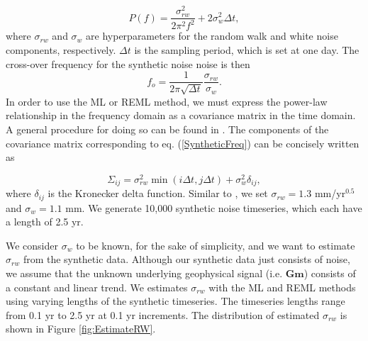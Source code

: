 \documentclass[10pt,a4paper]{article}
\begin{document}
\begin{equation}\label{SyntheticFreq}
P(f) = \frac{\sigma_{rw}^2}{2\pi^2 f^2} + 2\sigma_w^2\Delta t,
\end{equation}  
where $\sigma_{rw}$ and $\sigma_w$ are hyperparameters for the random walk and white noise components, respectively. $\Delta t$ is the sampling period, which is set at one day. The cross-over frequency for the synthetic noise noise is then
\begin{equation}\label{Crossover}
f_o = \frac{1}{2\pi\sqrt{\Delta t}}\frac{\sigma_{rw}}{\sigma_w}.  
\end{equation}
In order to use the ML or REML method, we must express the power-law relationship in the frequency domain as a covariance matrix in the time domain. A general procedure for doing  so can be found in \citet{Langbein2004}. The components of the covariance matrix corresponding to eq. (\ref{SyntheticFreq}) can be concisely written as

\begin{equation}\label{Covariance}
\Sigma_{ij} = \sigma_{rw}^2 \min(i\Delta t,j\Delta t) + \sigma_w^2 \delta_{ij},
\end{equation} 
where $\delta_{ij}$ is the Kronecker delta function. Similar to \citet{Langbein2012}, we set $\sigma_{rw} = 1.3$ mm/yr$^{0.5}$ and $\sigma_w = 1.1$ mm. We generate 10,000 synthetic noise timeseries, which each have a length of 2.5 yr. 

We consider $\sigma_w$ to be known, for the sake of simplicity, and we want to estimate $\sigma_{rw}$ from the synthetic data. Although our synthetic data just consists of noise, we assume that the unknown underlying geophysical signal (i.e. $\mathbf{G}\mathbf{m}$) consists of a constant and linear trend. We estimates $\sigma_{rw}$ with the ML and REML methods using varying lengths of the synthetic timeseries. The timeseries lengths range from 0.1 yr to 2.5 yr at 0.1 yr increments. The distribution of estimated $\sigma_{rw}$ is shown in Figure \ref{fig:EstimateRW}. 
\end{document}
